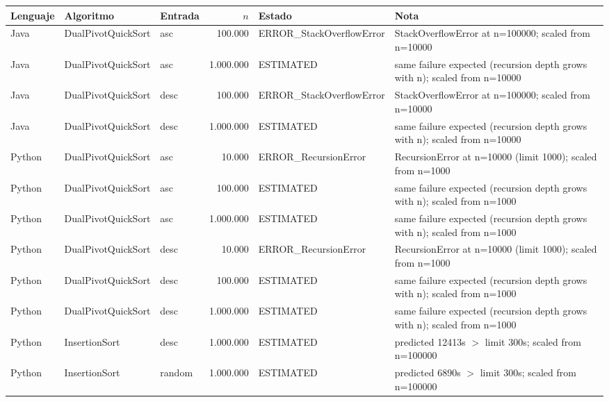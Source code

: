 {\tiny
\begin{tabular}{lllrlp{4.6cm}}
\toprule
Lenguaje & Algoritmo & Entrada & $n$ & Estado & Nota \\
\midrule
Java & DualPivotQuickSort & asc & 100.000 & ERROR\_StackOverflowError & StackOverflowError at n=100000; scaled from n=10000 \\
Java & DualPivotQuickSort & asc & 1.000.000 & ESTIMATED & same failure expected (recursion depth grows with n); scaled from n=10000 \\
Java & DualPivotQuickSort & desc & 100.000 & ERROR\_StackOverflowError & StackOverflowError at n=100000; scaled from n=10000 \\
Java & DualPivotQuickSort & desc & 1.000.000 & ESTIMATED & same failure expected (recursion depth grows with n); scaled from n=10000 \\
Python & DualPivotQuickSort & asc & 10.000 & ERROR\_RecursionError & RecursionError at n=10000 (limit 1000); scaled from n=1000 \\
Python & DualPivotQuickSort & asc & 100.000 & ESTIMATED & same failure expected (recursion depth grows with n); scaled from n=1000 \\
Python & DualPivotQuickSort & asc & 1.000.000 & ESTIMATED & same failure expected (recursion depth grows with n); scaled from n=1000 \\
Python & DualPivotQuickSort & desc & 10.000 & ERROR\_RecursionError & RecursionError at n=10000 (limit 1000); scaled from n=1000 \\
Python & DualPivotQuickSort & desc & 100.000 & ESTIMATED & same failure expected (recursion depth grows with n); scaled from n=1000 \\
Python & DualPivotQuickSort & desc & 1.000.000 & ESTIMATED & same failure expected (recursion depth grows with n); scaled from n=1000 \\
Python & InsertionSort & desc & 1.000.000 & ESTIMATED & predicted 12413s $>$ limit 300s; scaled from n=100000 \\
Python & InsertionSort & random & 1.000.000 & ESTIMATED & predicted 6890s $>$ limit 300s; scaled from n=100000 \\
\bottomrule
\end{tabular}}\par
